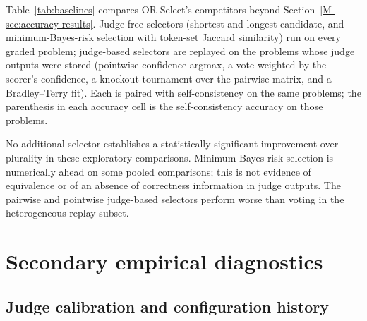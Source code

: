 Table~\ref{tab:baselines} compares OR-Select's competitors beyond
Section~\ref{M-sec:accuracy-results}. Judge-free selectors (shortest and
longest candidate, and minimum-Bayes-risk selection with token-set Jaccard
similarity) run on every graded problem; judge-based selectors are replayed on
the problems whose judge outputs were stored (pointwise confidence argmax,
a vote weighted by the scorer's confidence, a knockout tournament over the
pairwise matrix, and a Bradley--Terry fit). Each is paired with
self-consistency on the same problems; the parenthesis in each accuracy cell
is the self-consistency accuracy on those problems.

No additional selector establishes a statistically significant improvement
over plurality in these exploratory comparisons. Minimum-Bayes-risk selection
is numerically ahead on some pooled comparisons; this is not evidence of
equivalence or of an absence of correctness information in judge outputs.
The pairwise and pointwise judge-based selectors perform worse than voting
in the heterogeneous replay subset.

\begin{table}[htbp]
\centering
\caption{Additional selectors, paired with self-consistency (SC) on the same
graded problems. For each condition: problems $n$, accuracy \% (SC accuracy
\% on the same problems), problems where the selector is right and SC wrong
over the reverse, and the exact McNemar $p$. $^\dagger$: needs the stored
judge outputs, so $n$ is the replayable subset.}
\label{tab:baselines}
\small\setlength{\tabcolsep}{4pt}
\end{table}


\section{Secondary empirical diagnostics}
\label{sec:empirical-diagnostics}

\subsection{Judge calibration and configuration history}
\label{sec:judge-diagnostics}


